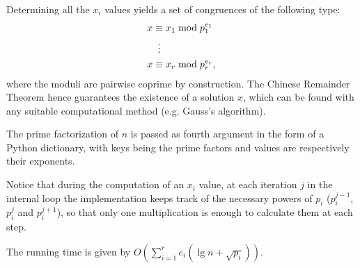 \documentclass[UTF8]{article}
\begin{document}
Determining all the $x_i$ values yields a set of congruences of the following type:
\begin{align*}
    x & \equiv x_1 \bmod{p_1^{e_1}} \\
      & \vdotswithin{\equiv}        \\
    x & \equiv x_r \bmod{p_r^{e_r}},
\end{align*}
where the moduli are pairwise coprime by construction. The Chinese Remainder Theorem hence guarantees the existence of a solution $x$, which can be found with any suitable computational method (e.g. Gauss's algorithm).

\begin{minipage}{\linewidth}

\end{minipage}

The prime factorization of $n$ is passed as fourth argument in the form of a Python dictionary, with keys being the prime factors and values are respectively their exponents.

Notice that during the computation of an $x_i$ value, at each iteration $j$ in the internal loop the implementation keeps track of the necessary powers of $p_i$ ($p_i^{j-1}$, $p_i^j$ and $p_i^{j+1}$), so that only one multiplication is enough to calculate them at each step.

The running time is given by $O(\sum_{i=1}^{r}e_i(\lg n + \sqrt{p_i}))$.
\end{document}
